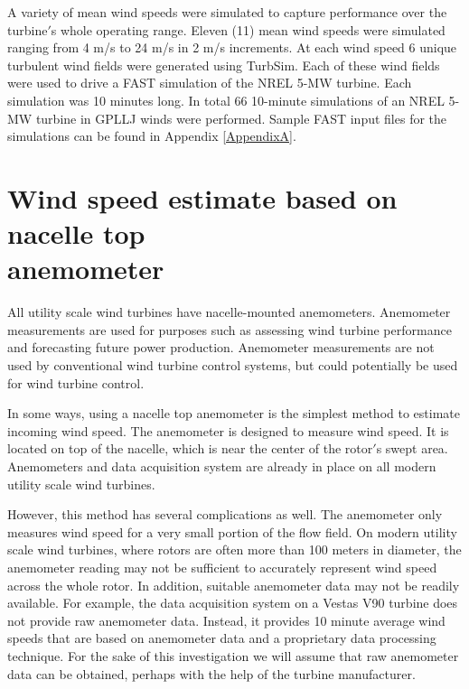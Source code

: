 A variety of mean wind speeds were simulated to capture performance over the turbine$'$s whole operating range. Eleven (11) mean wind speeds were simulated ranging from 4 m/s to 24 m/s in 2 m/s increments. At each wind speed 6 unique turbulent wind fields were generated using TurbSim. Each of these wind fields were used to drive a FAST simulation of the NREL 5-MW turbine. Each simulation was 10 minutes long. In total 66 10-minute simulations of an NREL 5-MW turbine in GPLLJ winds were performed.  Sample FAST input files for the simulations can be found in Appendix \ref{AppendixA}.






\section{Wind speed estimate based on nacelle top \\
anemometer}\label{section2-3}

All utility scale wind turbines have nacelle-mounted anemometers. Anemometer measurements are used for purposes such as assessing wind turbine performance and forecasting future power production. Anemometer measurements are not used by conventional wind turbine control systems, but could potentially be used for wind turbine control.

In some ways, using a nacelle top anemometer is the simplest method to estimate incoming wind speed. The anemometer is designed to measure wind speed. It is located on top of the nacelle, which is near the center of the rotor$'$s swept area. Anemometers and data acquisition system are already in place on all modern utility scale wind turbines. 

However, this method has several complications as well. The anemometer only measures wind speed for a very small portion of the flow field. On modern utility scale wind turbines, where rotors are often more than 100 meters in diameter, the anemometer reading may not be sufficient to accurately represent wind speed across the whole rotor. In addition, suitable anemometer data may not be readily available. For example, the data acquisition system on a Vestas V90 turbine does not provide raw anemometer data. Instead, it provides 10 minute average wind speeds that are based on anemometer data and a proprietary data processing technique. For the sake of this investigation we will assume that raw anemometer data can be obtained, perhaps with the help of the turbine manufacturer.

